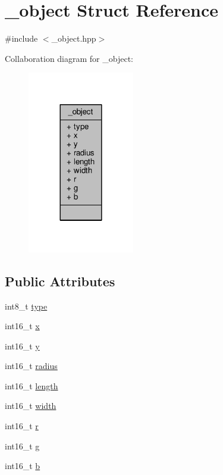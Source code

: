 \hypertarget{struct__object}{}\section{\+\_\+object Struct Reference}
\label{struct__object}


{\ttfamily \#include $<$\+\_\+object.\+hpp$>$}



Collaboration diagram for \+\_\+object\+:\nopagebreak
\begin{figure}[H]
\begin{center}
\leavevmode
\includegraphics[width=132pt]{struct__object__coll__graph}
\end{center}
\end{figure}
\subsection*{Public Attributes}
\begin{DoxyCompactItemize}
\item 
int8\+\_\+t \hyperlink{struct__object_a4ffae0568ef6772f8ebefa0997f79243}{type}
\item 
int16\+\_\+t \hyperlink{struct__object_adb6e178c2aa0bc48f5db6d85106c1680}{x}
\item 
int16\+\_\+t \hyperlink{struct__object_a48f88904fef6cb2f4ea22029174d76bc}{y}
\item 
int16\+\_\+t \hyperlink{struct__object_a870a8b24b7b3dc9244f543f096e9dae6}{radius}
\item 
int16\+\_\+t \hyperlink{struct__object_a9d23dfa35b2571bf0b89d4ca75f5c155}{length}
\item 
int16\+\_\+t \hyperlink{struct__object_a7dff64a3cc71a49786c1052bb6c250ca}{width}
\item 
int16\+\_\+t \hyperlink{struct__object_af5318fcc501c7951e1bf261de6c29b3b}{r}
\item 
int16\+\_\+t \hyperlink{struct__object_a89ebce79c5f2acba52f871e6833977ff}{g}
\item 
int16\+\_\+t \hyperlink{struct__object_a104af22ae68294943efb54edb7a46b0e}{b}
\end{DoxyCompactItemize}


